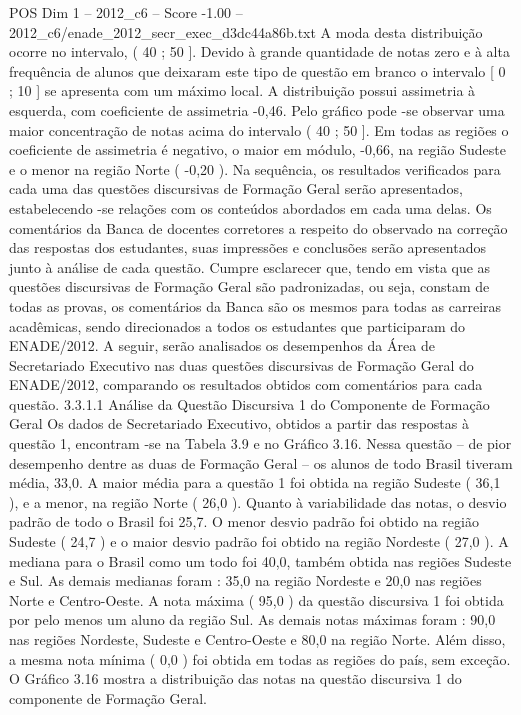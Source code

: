 \begin{textsample}{POS Dim 1 – 2012\_c6 – Score -1.00 – 2012\_c6/enade\_2012\_secr\_exec\_d3dc44a86b.txt}
A moda desta distribuição ocorre no intervalo, ( 40 ; 50 ].
Devido à grande quantidade de notas zero e à alta frequência de alunos que deixaram este tipo de questão em branco o intervalo [ 0 ; 10 ] se apresenta com um máximo local.
A distribuição possui assimetria à esquerda, com coeficiente de assimetria -0,46.
Pelo gráfico pode -se observar uma maior concentração de notas acima do intervalo ( 40 ; 50 ].
Em todas as regiões o coeficiente de assimetria é negativo, o maior em módulo, -0,66, na região Sudeste e o menor na região Norte ( -0,20 ).
Na sequência, os resultados verificados para cada uma das questões discursivas de Formação Geral serão apresentados, estabelecendo -se relações com os conteúdos abordados em cada uma delas.
Os comentários da Banca de docentes corretores a respeito do observado na correção das respostas dos estudantes, suas impressões e conclusões serão apresentados junto à análise de cada questão.
Cumpre esclarecer que, tendo em vista que as questões discursivas de Formação Geral são padronizadas, ou seja, constam de todas as provas, os comentários da Banca são os mesmos para todas as carreiras acadêmicas, sendo direcionados a todos os estudantes que participaram do ENADE/2012.
A seguir, serão analisados os desempenhos da Área de Secretariado Executivo nas duas questões discursivas de Formação Geral do ENADE/2012, comparando os resultados obtidos com comentários para cada questão. 3.3.1.1 Análise da Questão Discursiva 1 do Componente de Formação Geral Os dados de Secretariado Executivo, obtidos a partir das respostas à questão 1, encontram -se na Tabela 3.9 e no Gráfico 3.16.
Nessa questão – de pior desempenho dentre as duas de Formação Geral – os alunos de todo Brasil tiveram média, 33,0.
A maior média para a questão 1 foi obtida na região Sudeste ( 36,1 ), e a menor, na região Norte ( 26,0 ).
Quanto à variabilidade das notas, o desvio padrão de todo o Brasil foi 25,7.
O menor desvio padrão foi obtido na região Sudeste ( 24,7 ) e o maior desvio padrão foi obtido na região Nordeste ( 27,0 ).
A mediana para o Brasil como um todo foi 40,0, também obtida nas regiões Sudeste e Sul.
As demais medianas foram : 35,0 na região Nordeste e 20,0 nas regiões Norte e Centro-Oeste.
A nota máxima ( 95,0 ) da questão discursiva 1 foi obtida por pelo menos um aluno da região Sul.
As demais notas máximas foram : 90,0 nas regiões Nordeste, Sudeste e Centro-Oeste e 80,0 na região Norte.
Além disso, a mesma nota mínima ( 0,0 ) foi obtida em todas as regiões do país, sem exceção.
O Gráfico 3.16 mostra a distribuição das notas na questão discursiva 1 do componente de Formação Geral.

\end{textsample}
